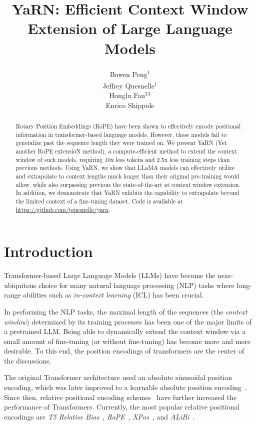 \documentclass{article} %
\title{YaRN: Efficient Context Window Extension of Large Language Models}
\author{
  Bowen Peng\textsuperscript{\dag}$^1$\\%
  \And
  Jeffrey Quesnelle\textsuperscript{\dag}$^1$\\%
  \And
  Honglu Fan$^2$$^3$ \\
  \And
  Enrico Shippole\\%
}
\date{
    $^1$Nous Research\\
    \and
    $^2$EleutherAI\\
    \and
    $^3$University of Geneva\\
}
\begin{document}
\maketitle

\renewcommand{\thefootnote}{\fnsymbol{footnote}}

\begin{abstract}
Rotary Position Embeddings (RoPE) have been shown to effectively encode positional information in transformer-based language models.
However, these models fail to generalize past the sequence length they were trained on.
We present YaRN (Yet another RoPE extensioN method), a compute-efficient method to extend the context window of such models, requiring 10x less tokens and 2.5x less training steps than previous methods.
Using YaRN, we show that LLaMA models can effectively utilize and extrapolate to context lengths much longer than their original pre-training would allow, while also surpassing previous the state-of-the-art at context window extension.
In addition, we demonstrate that YaRN exhibits the capability to extrapolate beyond the limited context of a fine-tuning dataset. Code is available at \url{https://github.com/jquesnelle/yarn}.
\end{abstract}


\section{Introduction}

Transformer-based Large Language Models\citep{vaswani2017attention} (LLMs) have become the near-ubiquitous choice for many natural language processing (NLP) tasks where long-range abilities such as \emph{in-context learning} (ICL) has been crucial.

In performing the NLP tasks, the maximal length of the sequences (the \emph{context window}) determined by its training processes has been one of the major limits of a pretrained LLM. Being able to dynamically extend the context window via a small amount of fine-tuning (or without fine-tuning) has become more and more desirable. To this end, the position encodings of transformers are the center of the discussions.


The original Transformer architecture used an absolute sinusoidal position encoding, which was later improved to a learnable absolute position encoding~\citep{gehring2017convolutional}.
Since then, relative positional encoding schemes~\citep{shaw2018self} have further increased the performance of Transformers.
Currently, the most popular relative positional encodings are \emph{T5 Relative Bias}~\citep{roberts2019t5}, \emph{RoPE}~\citep{su2022roformer}, \emph{XPos}~\citep{sun2022lengthextrapolatable}, and \emph{ALiBi}~\citep{press2022train}.
\end{document}
